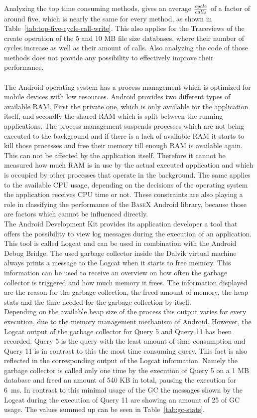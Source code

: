 Analyzing the top time consuming methods, gives an average ${cycle \over calls}$ of a factor of around five, which is nearly the same for every method, as shown in Table~\ref{tab:top-five-cycle-call-write}.
This also applies for the Traceviews of the create operation of the 5 and 10 MB file size databases, where their number of cycles increase as well as their amount of calls.
Also analyzing the code of those methods does not provide any possibility to effectively improve their performance.\\
\\
The Android operating system has a process management which is optimized for mobile devices with low resources.
Android provides two different types of available RAM. 
First the private one, which is only available for the application itself, and secondly the shared RAM which is split between the running applications.
The process management suspends processes which are not being executed to the background and if there is a lack of available RAM it starts to kill those processes and free their memory till enough RAM is available again.
This can not be affected by the application itself.
Therefore it cannot be measured how much RAM is in use by the actual executed application and which is occupied by other processes that operate in the background.
The same applies to the available CPU usage, depending on the decisions of the operating system the application receives CPU time or not.
These constraints are also playing a role in classifying the performance of the \textsc{BaseX} Android library, because those are factors which cannot be influenced directly.\\
The Android Development Kit provides its application developer a tool that offers the possibility to view log messages during the execution of an application.
This tool is called Logcat and can be used in combination with the Android Debug Bridge.
The used garbage collector inside the Dalvik virtual machine always prints a message to the Logcat when it starts to free memory.
This information can be used to receive an overview on how often the garbage collector is triggered and how much memory it frees.
The information displayed are the reason for the garbage collection, the freed amount of memory, the heap stats and the time needed for the garbage collection by itself.\\
Depending on the available heap size of the process this output varies for every execution, due to the memory management mechanism of Android.
However, the Logcat output of the garbage collector for Query 5 and Query 11 has been recorded.
Query 5 is the query with the least amount of time consumption and Query 11 is in contrast to this the most time consuming query.
This fact is also reflected in the corresponding output of the Logcat information.
Namely the garbage collector is called only one time by the execution of Query 5 on a 1 MB database and freed an amount of 540 KB in total, pausing the execution for 6~ms.
In contrast to this minimal usage of the GC the messages shown by the Logcat during the execution of Query 11 are showing an amount of 25 of GC usage.
The values summed up can be seen in Table~\ref{tab:gc-stats}.

